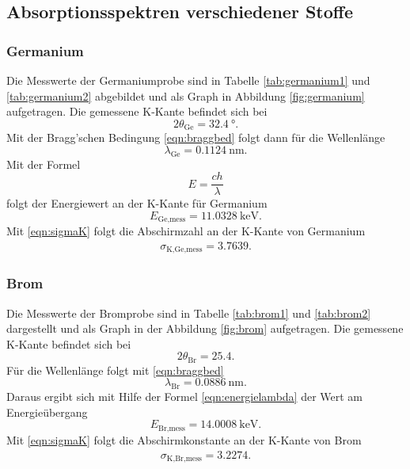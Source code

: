 \subsection{Absorptionsspektren verschiedener Stoffe}

\subsubsection{Germanium}

Die Messwerte der Germaniumprobe sind in Tabelle \ref{tab:germanium1} und
\ref{tab:germanium2} abgebildet
und als Graph in Abbildung \ref{fig:germanium} aufgetragen.
Die gemessene K-Kante befindet sich bei
\begin{equation}
  2\theta_\text{Ge} = \SI{32.4}{\degree}.
\end{equation}
Mit der Bragg'schen Bedingung \eqref{eqn:braggbed} folgt dann für die
Wellenlänge
\begin{equation}
  \lambda_\text{Ge} = \SI{0.1124}{\nano\meter}.
\end{equation}
Mit der Formel
\begin{equation}
  E = \frac{c h}{\lambda}
  \label{eqn:energielambda}
\end{equation}
folgt der Energiewert an der K-Kante für Germanium
\begin{equation}
  E_\text{Ge,mess} = \SI{11.0328}{\kilo\electronvolt}.
\end{equation}
Mit \eqref{eqn:sigmaK} folgt die Abschirmzahl an der K-Kante von Germanium
\begin{align}
  \sigma_\text{K,Ge,mess} = 3.7639.
\end{align}

\subsubsection{Brom}

Die Messwerte der Bromprobe sind in Tabelle \ref{tab:brom1} und \ref{tab:brom2}
dargestellt und als
Graph in der Abbildung \ref{fig:brom} aufgetragen.
Die gemessene K-Kante befindet sich bei
\begin{equation}
  2\theta_\text{Br} = 25.4 .
\end{equation}
Für die Wellenlänge folgt mit \eqref{eqn:braggbed}
\begin{equation}
  \lambda_\text{Br} = \SI{0.0886}{\nano\meter}.
\end{equation}
Daraus ergibt sich mit Hilfe der Formel \eqref{eqn:energielambda}
der Wert am Energieübergang
\begin{equation}
  E_\text{Br,mess} = \SI{14.0008}{\kilo\electronvolt}.
\end{equation}
Mit \eqref{eqn:sigmaK} folgt die Abschirmkonstante an der K-Kante von Brom
\begin{align}
  \sigma_\text{K,Br,mess} = 3.2274.
\end{align}

